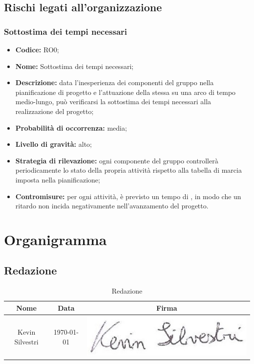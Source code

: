 \documentclass[./PianodiProgetto.tex]{subfiles}
\begin{document}
\section{Rischi legati all'organizzazione}
\subsection{Sottostima dei tempi necessari}
\begin{itemize}
	\item \textbf{Codice:} RO0;
	\item \textbf{Nome:} Sottostima dei tempi necessari;
	\item \textbf{Descrizione:} data l'inesperienza dei componenti del gruppo nella pianificazione di progetto e l'attuazione della stessa su una arco di tempo medio-lungo, può verificarsi la sottostima dei tempi necessari alla realizzazione del progetto;
	\item \textbf{Probabilità di occorrenza:} media;
	\item \textbf{Livello di gravità:} alto;
	\item \textbf{Strategia di rilevazione:} ogni componente del gruppo controllerà periodicamente lo stato della propria attività rispetto alla tabella di marcia imposta nella pianificazione;
	\item \textbf{Contromisure:} per ogni attività, è previsto un tempo di , in modo che un ritardo non incida negativamente nell'avanzamento del progetto.
\end{itemize}

\chapter{Organigramma}

\section{Redazione}
\begin{table}[H]
	\centering
	\begin{tabular}{|c|c|c|}
		\hline
		Nome&Data&Firma \\ \hline
		Kevin Silvestri& \today &\includegraphics[scale=0.5]{img/firme/SilvestriKevin} \\
		\hline
	\end{tabular}
	\caption{Redazione}
\end{table}
\end{document}
